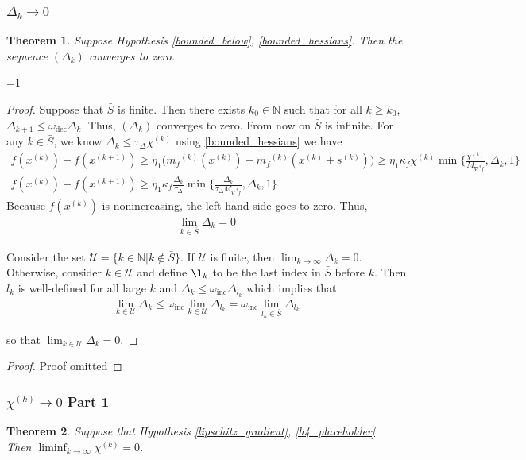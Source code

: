 \documentclass{article}
\newtheorem{theorem}{Theorem}[section]
\theoremstyle{case}
\newcommand{\xk}{{x^{(k)}}}
\newcommand{\xkpo}{{{x}^{(k+1)}}}
\newcommand{\dk}{\Delta_k}
\newcommand{\mfk}{{{m}_f}^{(k)}}
\newcommand{\sk}{{{s}^{(k)}}}
\newcommand{\chik}{{\chi^{(k)}}}
\newcommand{\omegainc}{\omega_{\text{inc}}}
\newcommand{\omegadec}{\omega_{\text{dec}}}
\newcommand{\ints}{\mathbb N} %
\newcommand{\oalpha}{\tau_{\Delta}}
\newcommand{\dkpo}{\Delta_{k+1}}
\newcommand{\hfb}{{M_{\nabla^2 f}}}
\def\includeproofs{1}
\begin{document}
\subsubsection{$\Delta_k \to 0$}
\begin{theorem}
Suppose Hypothesis \cref{bounded_below}, \cref{bounded_hessians}. Then the sequence $(\dk)$ converges to zero.
\end{theorem}
 
\ifnum\includeproofs=1
\begin{proof}

Suppose that $\bar{S}$ is finite. Then there exists $k_0 \in \ints$ such that for all $k \ge  k_0$, $\dkpo \le \omegadec \dk$.
Thus, $(\dk)$ converges to zero.
From now on $\bar{S}$ is infinite.
For any $k \in \bar{S}$, we know $\dk \le \oalpha \chik$ using \cref{bounded_hessians} we have
\begin{align*}
f(\xk) -  f(\xkpo) \ge \eta_1 \big (\mfk(\xk) - \mfk(\xk + \sk)\big ) \ge \eta_1 \kappa_f \chik \min\{\frac{\chik}{\hfb}, \dk, 1\}\\
f(\xk) - f(\xkpo) \ge \eta_1\kappa_f\frac{\dk}{\oalpha}\min\{\frac{\dk}{\oalpha \hfb}, \dk, 1\}
\end{align*}
Because $f(\xk)$ is nonincreasing, the left hand side goes to zero.
Thus,
\begin{align}
\lim_{k \in \bar{S}} \dk = 0
\end{align}


Consider the set
$\mathcal U = \{ k \in \ints | k \not \in \bar S \}$.
If $\mathcal U$ is finite, then $\lim_{k\to\infty}\dk = 0$.
Otherwise, consider $k \in \mathcal U$ and define $\l_k$ to be the last index in $\bar S$ before $k$.
Then $l_k$ is well-defined for all large $k$  and $\dk \le \omegainc \Delta_{l_k}$ which implies that
\begin{align}
\lim_{k \in \mathcal U } \dk \le \omegainc \lim_{k \in \mathcal U} \Delta_{l_k} = \omegainc \lim_{l_k \in \bar{S}} \Delta_{l_k}
\end{align}

so that $\lim_{k \in \mathcal U} \dk = 0$.
\end{proof}
\else
\begin{proof}
Proof omitted
\end{proof}
\fi




\subsubsection{$\chik \to 0$ Part 1}
\begin{theorem}
Suppose that Hypothesis \cref{lipschitz_gradient}, \cref{h4_placeholder}. Then $\liminf_{k\to\infty} \chik = 0$.
\end{theorem}
 
\end{document}
